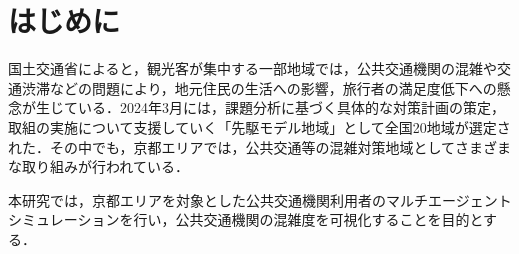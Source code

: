 \section{はじめに}
国土交通省によると，観光客が集中する一部地域では，公共交通機関の混雑や交通渋滞などの問題により，地元住民の生活への影響，旅行者の満足度低下への懸念が生じている\cite{kokudo2024}．2024年3月には，課題分析に基づく具体的な対策計画の策定，取組の実施について支援していく「先駆モデル地域」として全国20地域が選定された．その中でも，京都エリアでは，公共交通等の混雑対策地域としてさまざまな取り組みが行われている．

本研究では，京都エリアを対象とした公共交通機関利用者のマルチエージェントシミュレーションを行い，公共交通機関の混雑度を可視化することを目的とする．
